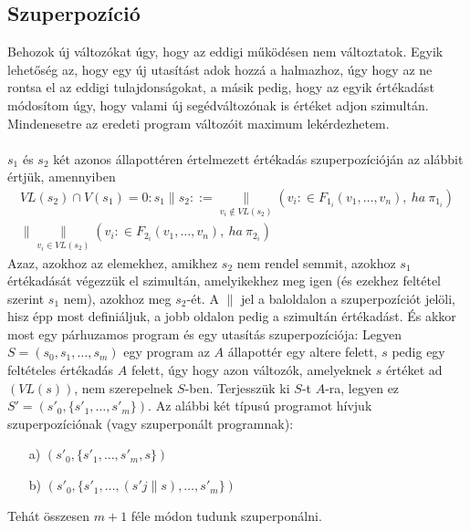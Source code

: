 \documentclass{article}
\begin{document}
\subsection*{Szuperpozíció}
Behozok új változókat úgy, hogy az eddigi működésen nem változtatok. Egyik lehetőség az, hogy egy új utasítást adok hozzá a halmazhoz, úgy hogy az ne rontsa el az eddigi tulajdonságokat, a másik pedig, hogy az egyik értékadást módosítom úgy, hogy valami új segédváltozónak is értéket adjon szimultán. Mindenesetre az eredeti program változóit maximum lekérdezhetem.
\\
\\
$s_1$ és $s_2$ két azonos állapottéren értelmezett értékadás szuperpozícióján az alábbit értjük, amennyiben
\begin{align*}
VL(s_2) \cap V(s_1) = 0 : s_1 \parallel s_2 ::= \underset{v_i \notin VL(s_2)}{\parallel}(v_i:\in F_{1_i}(v_1,\dots,v_n),\ ha\ \pi_{1_i})\\ \parallel \underset{v_i \in VL(s_2)}{\parallel}(v_i:\in F_{2_i}(v_1,\dots,v_n),\ ha\ \pi_{2_i})
\end{align*}
Azaz, azokhoz az elemekhez, amikhez $s_2$ nem rendel semmit, azokhoz $s_1$ értékadását végezzük el szimultán, amelyikekhez meg igen (és ezekhez feltétel szerint $s_1$ nem), azokhoz meg $s_2$-ét. A $\parallel$ jel a baloldalon a szuperpozíciót jelöli, hisz épp most definiáljuk, a jobb oldalon pedig a szimultán értékadást. És akkor most egy párhuzamos program és egy utasítás szuperpozíciója: Legyen $S = (s_0, {s_1,\dots,s_m})$ egy program az $A$ állapottér egy altere felett, $s$ pedig egy feltételes értékadás $A$ felett, úgy hogy azon változók, amelyeknek $s$ értéket ad $(VL(s))$, nem szerepelnek $S$-ben. Terjesszük ki $S$-t $A$-ra, legyen ez $S'=(s'_0, \lbrace s'_1,\dots, s'_m \rbrace)$. Az alábbi két típusú programot hívjuk szuperpozíciónak (vagy szuperponált programnak):
\begin{enumerate}
\item[a)] $(s'_0, \lbrace s'_1,\dots, s'_m,s \rbrace)$
\item[b)] $(s'_0, \lbrace s'_1,\dots,(s'j \parallel s),\dots, s'_m \rbrace)$
\end{enumerate}
Tehát összesen $m+1$ féle módon tudunk szuperponálni.
\end{document}
